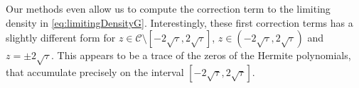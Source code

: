 \documentclass[%
 jmp,
cp,  %
 amsmath,amsthm,amssymb,%
 reprint,%
onecolumn]{revtex4-2}
\newtheorem{theorem}{Theorem}[section]
\begin{document}








Our methods even allow us to compute the correction term to the limiting density in \eqref{eq:limitingDensityG}. Interestingly, these first correction terms has a slightly different form for $z \in \mathcal C\setminus [-2\sqrt \tau,2\sqrt \tau]$, $z\in (-2\sqrt \tau, 2 \sqrt \tau)$  and $z=\pm 2 \sqrt{\tau}$.  This appears to be a trace of the zeros of the Hermite polynomials, that accumulate precisely on the interval $[-2\sqrt \tau, 2\sqrt \tau]$.
\end{document}

